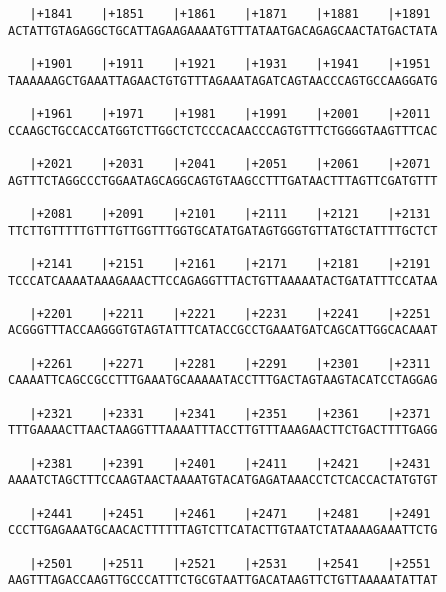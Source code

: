 \documentclass{article}
\begin{document}
\begin{Verbatim}
   |+1841    |+1851    |+1861    |+1871    |+1881    |+1891 
ACTATTGTAGAGGCTGCATTAGAAGAAAATGTTTATAATGACAGAGCAACTATGACTATA
                                                            
   |+1901    |+1911    |+1921    |+1931    |+1941    |+1951 
TAAAAAAGCTGAAATTAGAACTGTGTTTAGAAATAGATCAGTAACCCAGTGCCAAGGATG
                                                            
   |+1961    |+1971    |+1981    |+1991    |+2001    |+2011 
CCAAGCTGCCACCATGGTCTTGGCTCTCCCACAACCCAGTGTTTCTGGGGTAAGTTTCAC
                                                            
   |+2021    |+2031    |+2041    |+2051    |+2061    |+2071 
AGTTTCTAGGCCCTGGAATAGCAGGCAGTGTAAGCCTTTGATAACTTTAGTTCGATGTTT
                                                            
   |+2081    |+2091    |+2101    |+2111    |+2121    |+2131 
TTCTTGTTTTTGTTTGTTGGTTTGGTGCATATGATAGTGGGTGTTATGCTATTTTGCTCT
                                                            
   |+2141    |+2151    |+2161    |+2171    |+2181    |+2191 
TCCCATCAAAATAAAGAAACTTCCAGAGGTTTACTGTTAAAAATACTGATATTTCCATAA
                                                            
   |+2201    |+2211    |+2221    |+2231    |+2241    |+2251 
ACGGGTTTACCAAGGGTGTAGTATTTCATACCGCCTGAAATGATCAGCATTGGCACAAAT
                                                            
   |+2261    |+2271    |+2281    |+2291    |+2301    |+2311 
CAAAATTCAGCCGCCTTTGAAATGCAAAAATACCTTTGACTAGTAAGTACATCCTAGGAG
                                                            
   |+2321    |+2331    |+2341    |+2351    |+2361    |+2371 
TTTGAAAACTTAACTAAGGTTTAAAATTTACCTTGTTTAAAGAACTTCTGACTTTTGAGG
                                                            
   |+2381    |+2391    |+2401    |+2411    |+2421    |+2431 
AAAATCTAGCTTTCCAAGTAACTAAAATGTACATGAGATAAACCTCTCACCACTATGTGT
                                                            
   |+2441    |+2451    |+2461    |+2471    |+2481    |+2491 
CCCTTGAGAAATGCAACACTTTTTTAGTCTTCATACTTGTAATCTATAAAAGAAATTCTG
                                                            
   |+2501    |+2511    |+2521    |+2531    |+2541    |+2551 
AAGTTTAGACCAAGTTGCCCATTTCTGCGTAATTGACATAAGTTCTGTTAAAAATATTAT
                                                            

\end{Verbatim}
\end{document}
